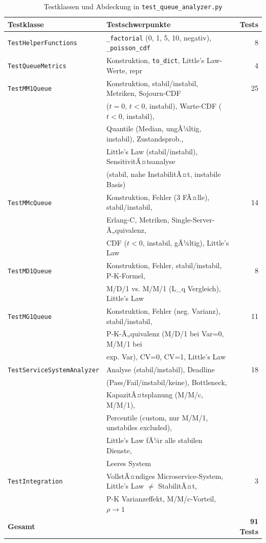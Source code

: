 ﻿\documentclass[a4paper,12pt]{report}
\theoremstyle{definition}
\begin{document}
\begin{table}
	\centering
	\begin{tabular}{@{}llr@{}}
		\toprule
		\textbf{Testklasse} & \textbf{Testschwerpunkte} & \textbf{Tests} \\
		\midrule
		\texttt{TestHelperFunctions} & \texttt{\_factorial} (0, 1, 5, 10, negativ),
		\texttt{\_poisson\_cdf} & 8 \\
		\texttt{TestQueueMetrics} & Konstruktion, \texttt{to\_dict},
		Little's Law-Werte, repr & 4 \\
		\texttt{TestMM1Queue} & Konstruktion, stabil/instabil, Metriken,
		Sojourn-CDF & 25 \\
		& ($t=0$, $t<0$, instabil), Warte-CDF ($t<0$, instabil), & \\
		& Quantile (Median, ungÃ¼ltig, instabil), Zustandsprob., & \\
		& Little's Law (stabil/instabil), SensitivitÃ¤tsanalyse & \\
		& (stabil, nahe InstabilitÃ¤t, instabile Basis) & \\
		\texttt{TestMMcQueue} & Konstruktion, Fehler (3 FÃ¤lle), stabil/instabil, & 14 \\
		& Erlang-C, Metriken, Single-Server-Ã„quivalenz, & \\
		& CDF ($t<0$, instabil, gÃ¼ltig), Little's Law & \\
		\texttt{TestMD1Queue} & Konstruktion, Fehler, stabil/instabil, P-K-Formel, & 8 \\
		& M/D/1 vs. M/M/1 (L\_q Vergleich), Little's Law & \\
		\texttt{TestMG1Queue} & Konstruktion, Fehler (neg. Varianz), stabil/instabil, & 11 \\
		& P-K-Ã„quivalenz (M/D/1 bei Var=0, M/M/1 bei & \\
		& exp. Var), CV=0, CV=1, Little's Law & \\
		\texttt{TestServiceSystemAnalyzer} & Analyse (stabil/instabil), Deadline & 18 \\
		& (Pass/Fail/instabil/keine), Bottleneck, & \\
		& KapazitÃ¤tsplanung (M/M/c, M/M/1), & \\
		& Percentile (custom, nur M/M/1, unstabiles excluded), & \\
		& Little's Law fÃ¼r alle stabilen Dienste, & \\
		& Leeres System & \\
		\texttt{TestIntegration} & VollstÃ¤ndiges Microservice-System,
		Little's Law $\neq$ StabilitÃ¤t, & 3 \\
		& P-K Varianzeffekt, M/M/c-Vorteil, $\rho \to 1$ & \\
		\midrule
		\textbf{Gesamt} & & \textbf{91 Tests} \\
		\bottomrule
	\end{tabular}
	\caption{Testklassen und Abdeckung in \texttt{test\_queue\_analyzer.py}}
\label{tab:test-queue}
	\label{tab:tests-queue}
\end{table}
\end{document}
